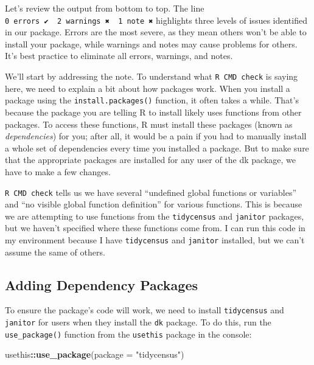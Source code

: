 \documentclass[
]{book}
\newenvironment{Shaded}{\begin{snugshade}}{\end{snugshade}}
\newcommand{\AttributeTok}[1]{\textcolor[rgb]{0.13,0.29,0.53}{#1}}
\newcommand{\FunctionTok}[1]{\textcolor[rgb]{0.13,0.29,0.53}{\textbf{#1}}}
\newcommand{\NormalTok}[1]{#1}
\newcommand{\SpecialCharTok}[1]{\textcolor[rgb]{0.81,0.36,0.00}{\textbf{#1}}}
\newcommand{\StringTok}[1]{\textcolor[rgb]{0.31,0.60,0.02}{#1}}
\begin{document}
Let's review the output from bottom to top. The line \texttt{0\ errors\ ✔\ \textbar{}\ 2\ warnings\ ✖\ \textbar{}\ 1\ note\ ✖} highlights three levels of issues identified in our package. Errors are the most severe, as they mean others won't be able to install your package, while warnings and notes may cause problems for others. It's best practice to eliminate all errors, warnings, and notes.

We'll start by addressing the note. To understand what \texttt{R\ CMD\ check} is saying here, we need to explain a bit about how packages work. When you install a package using the \texttt{install.packages()} function, it often takes a while. That's because the package you are telling R to install likely uses functions from other packages. To access these functions, R must install these packages (known as \emph{dependencies}) for you; after all, it would be a pain if you had to manually install a whole set of dependencies every time you installed a package. But to make sure that the appropriate packages are installed for any user of the dk package, we have to make a few changes.

\texttt{R\ CMD\ check} tells us we have several ``undefined global functions or variables'' and ``no visible global function definition'' for various functions. This is because we are attempting to use functions from the \texttt{tidycensus} and \texttt{janitor} packages, but we haven't specified where these functions come from. I can run this code in my environment because I have \texttt{tidycensus} and \texttt{janitor} installed, but we can't assume the same of others.

\hypertarget{adding-dependency-packages}{%
\subsection*{Adding Dependency Packages}\label{adding-dependency-packages}}

To ensure the package's code will work, we need to install \texttt{tidycensus} and \texttt{janitor} for users when they install the \texttt{dk} package. To do this, run the \texttt{use\_package()} function from the \texttt{usethis} package in the console:

\begin{Shaded}
\begin{Highlighting}[]
\NormalTok{usethis}\SpecialCharTok{::}\FunctionTok{use\_package}\NormalTok{(}\AttributeTok{package =} \StringTok{"tidycensus"}\NormalTok{)}
\end{Highlighting}
\end{Shaded}
\end{document}
